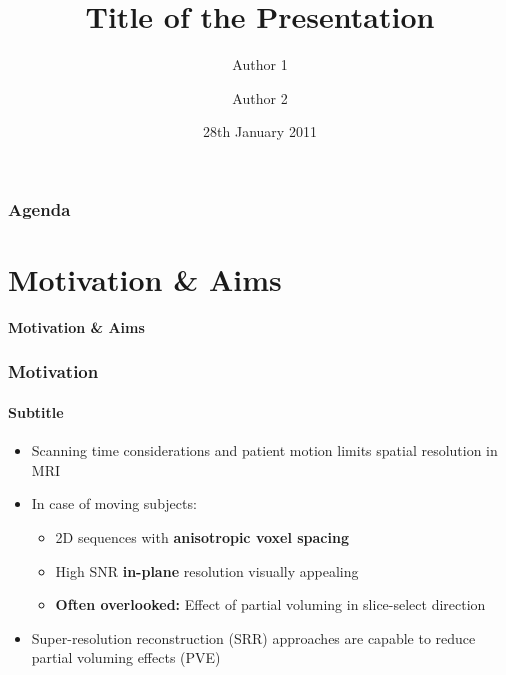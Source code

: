 \documentclass[compress,12pt,handout]{beamer}
\title[Short Title]{Title of the Presentation}
\author[Auth. 1 \and Auth.2]{Author 1 \and Author 2}
\institute[UCL]{%
  Department of Statistical Science \\ %
  University College London
}
\date{28th January 2011}
\def\headline#1{\begin{frame}[c]\centering\color{headlinecolor}\LARGE\bfseries#1\end{frame}}
\begin{document}
\begin{frame}
  \titlepage
\end{frame}

\begin{frame}[t]\frametitle{Agenda}
   \tableofcontents%
\end{frame}





\section{Motivation \& Aims}
\headline{Motivation \& Aims}


\begin{frame}[t]\frametitle{Motivation}\framesubtitle{Subtitle}
    \begin{itemize}[<+->]\setlength{\itemsep}{12pt}
        \item Scanning time considerations and patient motion limits spatial resolution in MRI
        \item In case of moving subjects:
        \begin{itemize}
            \item 2D sequences with {\bf anisotropic voxel spacing}
            \item High SNR {\bf in-plane} resolution visually appealing
            \item \textbf{Often overlooked:} Effect of partial voluming in slice-select direction
        \end{itemize}
        \item Super-resolution reconstruction (SRR) approaches are capable to reduce partial voluming effects (PVE)
    \end{itemize}
\end{frame}
\end{document}
